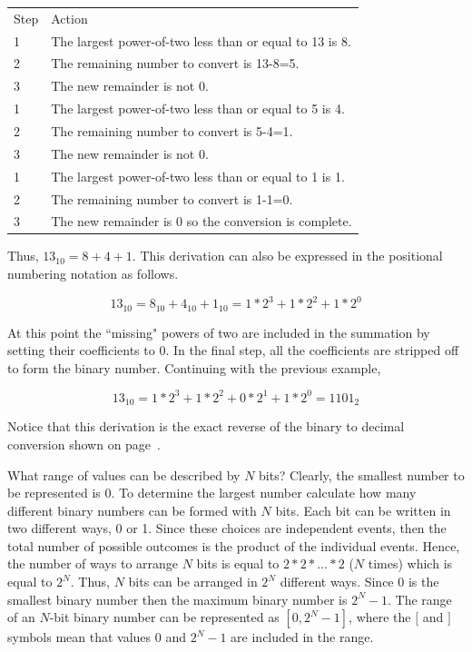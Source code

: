 \begin{tabular}{ll}
    Step & Action \\
    1 & The largest power-of-two less than or equal to 13 is 8. \\
    2 & The remaining number to convert is 13-8=5. \\
    3 & The new remainder is not 0. \\
    1 & The largest power-of-two less than or equal to 5 is 4. \\
    2 & The remaining number to convert is 5-4=1. \\
    3 & The new remainder is not 0. \\
    1 & The largest power-of-two less than or equal to 1 is 1. \\
    2 & The remaining number to convert is 1-1=0. \\
    3 & The new remainder is 0 so the conversion is complete. \\
\end{tabular}

Thus, $13_{10} = 8+4+1$.  This derivation can also be expressed in the
positional numbering notation as follows.

$$13_{10} = 8_{10} + 4_{10} + 1_{10} = 1*2^3 + 1*2^2 + 1*2^0 $$

At this point the ``missing" powers of two are included in the
summation by setting their coefficients to 0.  In the final step, all
the coefficients are stripped off to form the binary number.  Continuing
with the previous example,

$$13_{10} = 1*2^3 + 1*2^2 + 0*2^1 + 1*2^0 = 1101_2$$

Notice that this derivation is the exact reverse of the binary to
decimal conversion shown on page~\pageref{page:bin2dec}.

\label{page:two-to-N}
What range of values can be described by $N$ bits?  Clearly, the smallest
number to be represented is 0.  To determine the largest number
calculate how many different binary numbers can be formed with $N$ bits.
Each bit can be written in two different ways, 0 or 1. Since these choices
are independent events, then the total number of
possible outcomes is the product of the individual events.  Hence, the
number of ways to arrange $N$ bits is equal to $2*2* \ldots *2$ ($N$ times)
which is equal to $2^N$.  Thus, $N$ bits can be arranged in $2^N$ different
ways. Since 0 is the smallest binary number then the maximum binary number
is $2^N-1$.  The range of an $N$-bit binary number can be represented
as $[0,2^{N}-1]$, where the $[$ and $]$ symbols mean that values 0 and
$2^{N}-1$ are included in the range.

